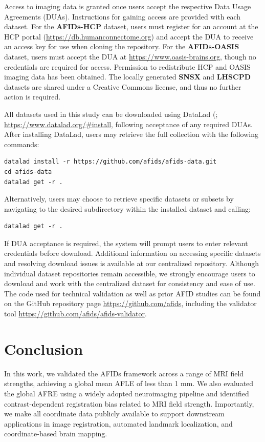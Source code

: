 Access to imaging data is granted once users accept the respective Data Usage Agreements (DUAs). Instructions for gaining access are provided with each dataset. For the \textbf{AFIDs-HCP} dataset, users must register for an account at the HCP portal (\url{https://db.humanconnectome.org}) and accept the DUA to receive an access key for use when cloning the repository. For the \textbf{AFIDs-OASIS} dataset, users must accept the DUA at \url{https://www.oasis-brains.org}, though no credentials are required for access. Permission to redistribute HCP and OASIS imaging data has been obtained. The locally generated \textbf{SNSX} and \textbf{LHSCPD} datasets are shared under a Creative Commons license, and thus no further action is required.

All datasets used in this study can be downloaded using DataLad (\cite{Halchenko2021-px}; \url{https://www.datalad.org/#install}, following acceptance of any required DUAs. After installing DataLad, users may retrieve the full collection with the following commands:
\begin{verbatim}
datalad install -r https://github.com/afids/afids-data.git
cd afids-data
datalad get -r .
\end{verbatim}

Alternatively, users may choose to retrieve specific datasets or subsets by navigating to the desired subdirectory within the installed dataset and calling:
\begin{verbatim}
datalad get -r .
\end{verbatim}

If DUA acceptance is required, the system will prompt users to enter relevant credentials before download. Additional information on accessing specific datasets and resolving download issues is available at our centralized repository. Although individual dataset repositories remain accessible, we strongly encourage users to download and work with the centralized dataset for consistency and ease of use. The code used for technical validation as well as prior AFID studies can be found on the GitHub repository page \url{https://github.com/afids}, including the validator tool \url{https://github.com/afids/afids-validator}.

\section{Conclusion}
In this work, we validated the AFIDs framework across a range of MRI field strengths, achieving a global mean AFLE of less than 1 mm. We also evaluated the global AFRE using a widely adopted neuroimaging pipeline and identified contrast-dependent registration bias related to MRI field strength. Importantly, we make all coordinate data publicly available to support downstream applications in image registration, automated landmark localization, and coordinate-based brain mapping.